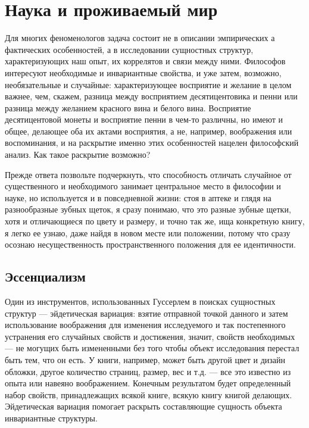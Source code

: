 \documentclass[11pt]{book}
\begin{document}
\chapter{Наука и проживаемый мир}

Для многих феноменологов задача состоит не в описании эмпирических а фактических особенностей, а в исследовании сущностных структур, характеризующих наш опыт, их коррелятов и связи между ними. Философов интересуют необходимые и инвариантные свойства, и уже затем, возможно, необязательные и случайные: характеризующее восприятие и желание в целом важнее, чем, скажем, разница между восприятием десятицентовика и пенни или разница между желанием красного вина и белого вина. Восприятие десятицентовой монеты и восприятие пенни в чем-то различны, но имеют и общее, делающее оба их актами восприятия, а не, например, воображения или воспоминания, и на раскрытие именно этих особенностей нацелен философский анализ. Как такое раскрытие возможно?

Прежде ответа позвольте подчеркнуть, что способность отличать случайное от существенного и необходимого занимает центральное место в философии и науке, но используется и в повседневной жизни: стоя в аптеке и глядя на разнообразные зубных щеток, я сразу понимаю, что это разные зубные щетки, хотя и отличающиеся по цвету и размеру, и точно так же, ища конкретную книгу, я легко ее узнаю, даже найдя в новом месте или положении, потому что сразу осознаю несущественность пространственного положения для ее идентичности.

\section{Эссенциализм}

Один из инструментов, использованных Гуссерлем в поисках сущностных структур --- эйдетическая вариация: взятие отправной точкой данного и затем использование воображения для изменения исследуемого и так постепенного устранения его случайных свойств и достижения, значит, свойств необходимых --- не могущих быть измененными без того чтобы объект исследования перестал быть тем, что он есть. У книги, например, может быть другой цвет и дизайн обложки, другое количество страниц, размер, вес и т.д. --- все это известно из опыта или навеяно воображением. Конечным результатом будет определенный набор свойств, принадлежащих всякой книге, всякую книгу книгой делающих. Эйдетическая вариация помогает раскрыть составляющие сущность объекта инвариантные структуры.
\end{document}
